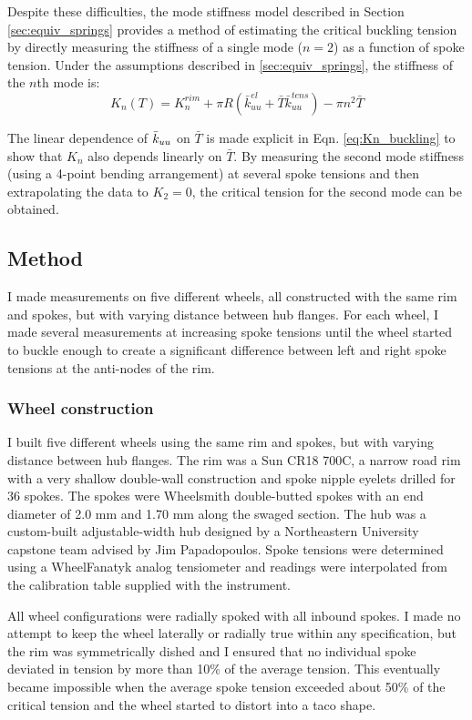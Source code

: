 \documentclass[\rootdir/thesis.tex]{subfiles}
\begin{document}
Despite these difficulties, the mode stiffness model described in Section \ref{sec:equiv_springs} provides a method of estimating the critical buckling tension by directly measuring the stiffness of a single mode ($n=2$) as a function of spoke tension. Under the assumptions described in \ref{sec:equiv_springs}, the stiffness of the $n$th mode is:
\begin{equation}
\label{eq:Kn_buckling}
K_n(T) = K_n^{rim} + \pi R (\bar{k}_{uu}^{el} + \bar{T} \bar{k}_{uu}^{tens}) - \pi n^2 \bar{T}
\end{equation}

The linear dependence of $\bar{k}_{uu}$ on $\bar{T}$ is made explicit in Eqn. \eqref{eq:Kn_buckling} to show that $K_n$ also depends linearly on $\bar{T}$. By measuring the second mode stiffness (using a 4-point bending arrangement) at several spoke tensions and then extrapolating the data to $K_2 = 0$, the critical tension for the second mode can be obtained.

\subsection{Method}

I made measurements on five different wheels, all constructed with the same rim and spokes, but with varying distance between hub flanges. For each wheel, I made several measurements at increasing spoke tensions until the wheel started to buckle enough to create a significant difference between left and right spoke tensions at the anti-nodes of the rim.

\subsubsection{Wheel construction}

I built five different wheels using the same rim and spokes, but with varying distance between hub flanges. The rim was a Sun CR18 700C, a narrow road rim with a very shallow double-wall construction and spoke nipple eyelets drilled for 36 spokes. The spokes were Wheelsmith double-butted spokes with an end diameter of 2.0 mm and 1.70 mm along the swaged section. The hub was a custom-built adjustable-width hub designed by a Northeastern University capstone team advised by Jim Papadopoulos. Spoke tensions were determined using a WheelFanatyk analog tensiometer and readings were interpolated from the calibration table supplied with the instrument.

All wheel configurations were radially spoked with all inbound spokes. I made no attempt to keep the wheel laterally or radially true within any specification, but the rim was symmetrically dished and I ensured that no individual spoke deviated in tension by more than 10\% of the average tension. This eventually became impossible when the average spoke tension exceeded about 50\% of the critical tension and the wheel started to distort into a taco shape.
\end{document}
